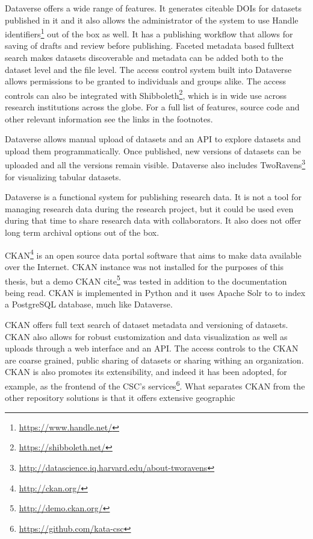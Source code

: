 Dataverse offers a wide range of features. It generates citeable DOIs for
datasets published in it and it also allows the administrator of the system
to use Handle identifiers\footnote{\url{https://www.handle.net/}} out of the
box as well. It has a publishing workflow that allows for saving of drafts and
review before publishing. Faceted metadata based fulltext search makes datasets
discoverable and metadata can be added both to the dataset level and the file
level. The access control system built into Dataverse allows permissions to be
granted to individuals and groups alike. The access controls can also be
integrated with Shibboleth\footnote{\url{https://shibboleth.net/}}, which is in
wide use across research institutions across the globe. For a full list of
features, source code and other relevant information see the links in the
footnotes.

Dataverse allows manual upload of datasets and an API to explore datasets
and upload them programmatically. Once published, new versions of datasets
can be uploaded and all the versions remain visible. Dataverse also includes
TwoRavens\footnote{\url{http://datascience.iq.harvard.edu/about-tworavens}}
for visualizing tabular datasets.

Dataverse is a functional system for publishing research data. It is not a tool
for managing research data during the research project, but it could be used
even during that time to share research data with collaborators. It also does
not offer long term archival options out of the box.

CKAN\footnote{\url{http://ckan.org/}} is an open source data portal software that aims to make data available
over the Internet. CKAN instance was not installed for the purposes of this
thesis, but a demo CKAN cite\footnote{\url{http://demo.ckan.org/}} was tested
in addition to the documentation being read. CKAN is implemented in Python and
it uses Apache Solr to to index a PostgreSQL database, much like Dataverse.

CKAN offers full text search of dataset metadata and versioning of datasets.
CKAN also allows for robust customization and data visualization as well as
uploads through a web interface and an API. The access controls to the CKAN
are coarse grained, public sharing of datasets or sharing withing an
organization. CKAN is also promotes its extensibility, and indeed it has been
adopted, for example, as the frontend of the CSC's
services\footnote{\url{https://github.com/kata-csc}}. What separates CKAN from
the other repository solutions is that it offers extensive geographic

